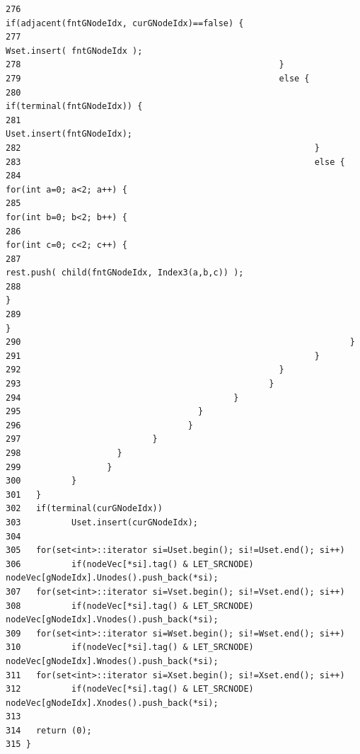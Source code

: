 \begin{verbatim}
276                                                   if(adjacent(fntGNodeIdx, curGNodeIdx)==false) {
277                                                          Wset.insert( fntGNodeIdx );
278                                                   }
279                                                   else {
280                                                          if(terminal(fntGNodeIdx)) {
281                                                                 Uset.insert(fntGNodeIdx);
282                                                          }
283                                                          else { 
284                                                                 for(int a=0; a<2; a++) {
285                                                                   for(int b=0; b<2; b++) {
286                                                                          for(int c=0; c<2; c++) {
287                                                                                 rest.push( child(fntGNodeIdx, Index3(a,b,c)) );
288                                                                          }
289                                                                   }
290                                                                 }
291                                                          }
292                                                   }
293                                                 }
294                                          }
295                                   }
296                                 }
297                          }
298                   }
299                 }
300          }
301   }
302   if(terminal(curGNodeIdx))
303          Uset.insert(curGNodeIdx);
304   
305   for(set<int>::iterator si=Uset.begin(); si!=Uset.end(); si++)
306          if(nodeVec[*si].tag() & LET_SRCNODE)           nodeVec[gNodeIdx].Unodes().push_back(*si);
307   for(set<int>::iterator si=Vset.begin(); si!=Vset.end(); si++)
308          if(nodeVec[*si].tag() & LET_SRCNODE)           nodeVec[gNodeIdx].Vnodes().push_back(*si);
309   for(set<int>::iterator si=Wset.begin(); si!=Wset.end(); si++)
310          if(nodeVec[*si].tag() & LET_SRCNODE)           nodeVec[gNodeIdx].Wnodes().push_back(*si);
311   for(set<int>::iterator si=Xset.begin(); si!=Xset.end(); si++)
312          if(nodeVec[*si].tag() & LET_SRCNODE)           nodeVec[gNodeIdx].Xnodes().push_back(*si);
313   
314   return (0);
315 }
\end{verbatim}\normalsize 


